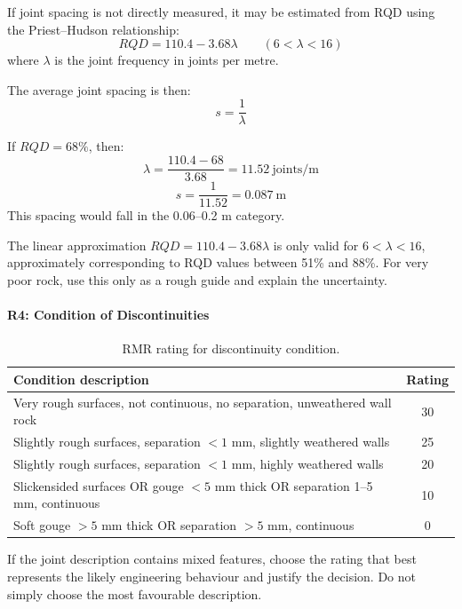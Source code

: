 If joint spacing is not directly measured, it may be estimated from RQD using the
Priest--Hudson relationship:
\[
RQD = 110.4 - 3.68\lambda
\qquad
(6 < \lambda < 16)
\]
where \(\lambda\) is the joint frequency in joints per metre.

The average joint spacing is then:
\[
s = \frac{1}{\lambda}
\]

\begin{calcbox}
If \(RQD = 68\%\), then:
\[
\lambda = \frac{110.4 - 68}{3.68} = 11.52~\text{joints/m}
\]
\[
s = \frac{1}{11.52}=0.087~\text{m}
\]
This spacing would fall in the 0.06--0.2 m category.
\end{calcbox}

\begin{warnbox}
The linear approximation \(RQD = 110.4 - 3.68\lambda\) is only valid for
\(6 < \lambda < 16\), approximately corresponding to RQD values between 51\% and 88\%.
For very poor rock, use this only as a rough guide and explain the uncertainty.
\end{warnbox}

\paragraph{R4: Condition of Discontinuities}

\begin{table}[H]
\centering
\small
\begin{tabularx}{\textwidth}{Y c}
\toprule
\textbf{Condition description} & \textbf{Rating} \\
\midrule
Very rough surfaces, not continuous, no separation, unweathered wall rock & 30 \\
Slightly rough surfaces, separation \(<1\) mm, slightly weathered walls & 25 \\
Slightly rough surfaces, separation \(<1\) mm, highly weathered walls & 20 \\
Slickensided surfaces OR gouge \(<5\) mm thick OR separation 1--5 mm, continuous & 10 \\
Soft gouge \(>5\) mm thick OR separation \(>5\) mm, continuous & 0 \\
\bottomrule
\end{tabularx}
\caption{RMR rating for discontinuity condition.}
\label{tab:rmr_condition}
\end{table}

\begin{notebox}
If the joint description contains mixed features, choose the rating that best represents
the likely engineering behaviour and justify the decision. Do not simply choose the most
favourable description.
\end{notebox}

